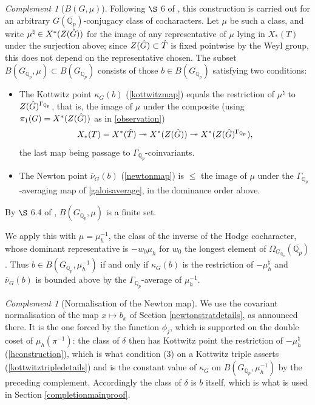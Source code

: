 \documentclass[11pt,a4paper]{article}
\theoremstyle{definition}
\theoremstyle{plain}
\theoremstyle{remark}
\newtheorem{Rc}[shared]{Complement}
\theoremstyle{plain}
\begin{document}
\begin{Rc}[$B(G,\mu)$]
    Following $\S$ 6 of \cite{MR1485921}, this construction is carried out for an arbitrary $G(\overline{\mathbb{Q}_p})$-conjugacy class of cocharacters. Let $\mu$ be such a class, and write $\mu^{\natural} \in X^*(Z(\Hat{G}))$ for the image of any representative of $\mu$ lying in $X_*(T)$ under the surjection above; since $Z(\Hat{G}) \subset \Hat{T}$ is fixed pointwise by the Weyl group, this does not depend on the representative chosen. The subset $B(G_{\mathbb{Q}_p}, \mu) \subset B(G_{\mathbb{Q}_p})$ consists of those $b \in B(G_{\mathbb{Q}_p})$ satisfying two conditions:
    \begin{itemize}
        \item The Kottwitz point $\kappa_G(b)$ (\ref{kottwitzmap}) equals the restriction of $\mu^{\natural}$ to $Z(\Hat{G})^{\Gamma_{\mathbb{Q}_p}}$, that is, the image of $\mu$ under the composite (using $\pi_1(G) = X^*(Z(\Hat{G}))$ as in \ref{observation})
        $$X_*(T) = X^*(\Hat{T}) \twoheadrightarrow X^*(Z(\Hat{G})) \twoheadrightarrow X^*(Z(\Hat{G})^{\Gamma_{\mathbb{Q}_p}}),$$
        the last map being passage to $\Gamma_{\mathbb{Q}_p}$-coinvariants.
        \item The Newton point $\overline{\nu}_G(b)$ (\ref{newtonmap}) is $\leq$ the image of $\mu$ under the $\Gamma_{\mathbb{Q}_p}$-averaging map of \ref{galoisaverage}, in the dominance order above.
    \end{itemize}
    By $\S$ 6.4 of \cite{MR1485921}, $B(G_{\mathbb{Q}_p}, \mu)$ is a finite set.

    We apply this with $\mu = \mu_h^{-1}$, the class of the inverse of the Hodge cocharacter, whose dominant representative is $-w_0\mu_h$ for $w_0$ the longest element of $\Omega_{G_{\mathbb{Q}_p}}(\overline{\mathbb{Q}_p})$. Thus $b \in B(G_{\mathbb{Q}_p}, \mu_h^{-1})$ if and only if $\kappa_G(b)$ is the restriction of $-\mu_h^{\natural}$ and $\overline{\nu}_G(b)$ is bounded above by the $\Gamma_{\mathbb{Q}_p}$-average of $\mu_h^{-1}$.
\end{Rc}

\begin{Rc}[Normalisation of the Newton map]\label{newtonnormalisation}
    We use the covariant normalisation of the map $x \mapsto b_x$ of Section \ref{newtonstratdetails}, as announced there. It is the one forced by the function $\phi_j$, which is supported on the double coset of $\mu_h(\pi^{-1})$: the class of $\delta$ then has Kottwitz point the restriction of $-\mu_h^{\natural}$ (\ref{hconstruction}), which is what condition (3) on a Kottwitz triple asserts (\ref{kottwitztripledetails}) and is the constant value of $\kappa_G$ on $B(G_{\mathbb{Q}_p}, \mu_h^{-1})$ by the preceding complement. Accordingly the class of $\delta$ is $b$ itself, which is what is used in Section \ref{completionmainproof}.
\end{Rc}
\end{document}
